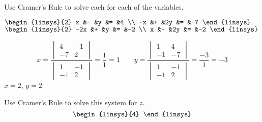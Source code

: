 \begin{exercises}
  \item 
    Use Cramer's Rule to solve each for each of the variables.
    \begin{exparts*}
      \partsitem $\begin{linsys}{2}
                    x  &- &y  &=  &4  \\
                   -x  &+ &2y &=  &-7
                  \end{linsys}$
      \partsitem $\begin{linsys}{2}
                    -2x  &+  &y  &=  &-2 \\
                      x  &-  &2y &=  &-2  
                  \end{linsys}$
    \end{exparts*}
    \begin{answer}
      \begin{exparts*}
        \partsitem 
          \begin{equation*}
            x=
             \frac{ \begin{vmatrix}
                       4  &-1  \\
                      -7  &2   
                    \end{vmatrix}  }{
                    \begin{vmatrix}
                       1  &-1  \\
                      -1  &2 
                    \end{vmatrix}  }
            =\frac{1}{1}=1
            \qquad
            y=
             \frac{ \begin{vmatrix}
                       1  &4  \\
                      -1  &-7   
                    \end{vmatrix}  }{
                    \begin{vmatrix}
                       1  &-1  \\
                      -1  &2 
                    \end{vmatrix}  }
            =\frac{-3}{1}=-3
          \end{equation*}
        \partsitem $x=2$, $y=2$
      \end{exparts*} 
    \end{answer}
  \item 
    Use Cramer's Rule to solve this system for \( z \).
    \begin{equation*}
      \begin{linsys}{4}

\end{linsys}
\end{equation*}
\end{exercises}
